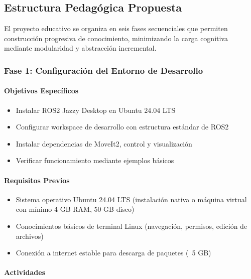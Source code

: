 \subsection{Estructura Pedagógica Propuesta}

El proyecto educativo se organiza en seis fases secuenciales que permiten construcción progresiva de conocimiento, minimizando la carga cognitiva mediante modularidad y abstracción incremental.

\subsubsection{Fase 1: Configuración del Entorno de Desarrollo}

\paragraph{Objetivos Específicos}
\begin{itemize}
    \item Instalar ROS2 Jazzy Desktop en Ubuntu 24.04 LTS
    \item Configurar workspace de desarrollo con estructura estándar de ROS2
    \item Instalar dependencias de MoveIt2, control y visualización
    \item Verificar funcionamiento mediante ejemplos básicos
\end{itemize}

\paragraph{Requisitos Previos}
\begin{itemize}
    \item Sistema operativo Ubuntu 24.04 LTS (instalación nativa o máquina virtual con mínimo 4 GB RAM, 50 GB disco)
    \item Conocimientos básicos de terminal Linux (navegación, permisos, edición de archivos)
    \item Conexión a internet estable para descarga de paquetes (~5 GB)
\end{itemize}

\paragraph{Actividades}


